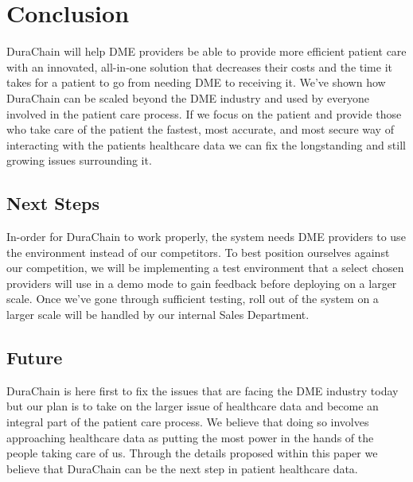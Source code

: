 \documentclass[12pt]{article}
\begin{document}
\section{Conclusion}
DuraChain will help DME providers be able to provide more efficient patient care with an innovated, all-in-one solution that decreases their costs and the time it takes for a patient to go from needing DME to receiving it. We’ve shown how DuraChain can be scaled beyond the DME industry and used by everyone involved in the patient care process. If we focus on the patient and provide those who take care of the patient the fastest, most accurate, and most secure way of interacting with the patients healthcare data we can fix the longstanding and still growing issues surrounding it.



  \subsection{Next Steps}
  In-order for DuraChain to work properly, the system needs DME providers to use the environment instead of our competitors. To best position ourselves against our competition, we will be implementing a test environment that a select chosen providers will use in a demo mode to gain feedback before deploying on a larger scale. Once we’ve gone through sufficient testing, roll out of the system on a larger scale will be handled by our internal Sales Department.

  \subsection{Future}
  DuraChain is here first to fix the issues that are facing the DME industry today but our plan is to take on the larger issue of healthcare data and become an integral part of the patient care process. We believe that doing so involves approaching healthcare data as putting the most power in the hands of the people taking care of us. Through the details proposed within this paper we believe that DuraChain can be the next step in patient healthcare data.
\end{document}
